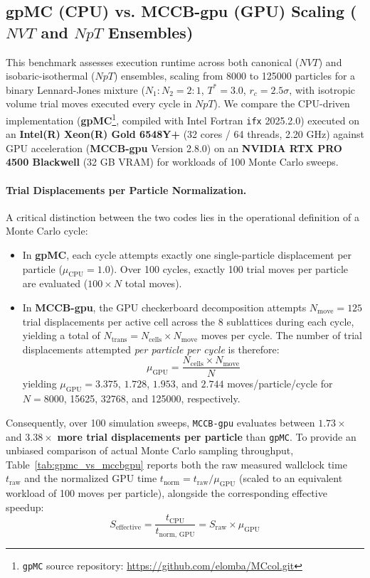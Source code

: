 \documentclass[12pt]{article}
\begin{document}
\subsection{gpMC (CPU) vs. MCCB-gpu (GPU) Scaling (\texorpdfstring{$NVT$ and $NpT$}{NVT and NpT} Ensembles)}
\label{sec:small_scale}
This benchmark assesses execution runtime across both canonical ($NVT$) and isobaric-isothermal ($NpT$) ensembles, scaling from \num{8000} to \num{125000} particles for a binary Lennard-Jones mixture ($N_1 : N_2 = 2 : 1$, $T^* = 3.0$, $r_c = 2.5\sigma$, with isotropic volume trial moves executed every cycle in $NpT$). We compare the CPU-driven implementation (\textbf{gpMC}\footnote{\texttt{gpMC} source repository: \url{https://github.com/elomba/MCcol.git}}, compiled with Intel Fortran \texttt{ifx} 2025.2.0) executed on an \textbf{Intel(R) Xeon(R) Gold 6548Y+} (32 cores / 64 threads, 2.20 GHz) against GPU acceleration (\textbf{MCCB-gpu} Version 2.8.0) on an \textbf{NVIDIA RTX PRO 4500 Blackwell} (32 GB VRAM) for workloads of 100 Monte Carlo sweeps.

\paragraph{Trial Displacements per Particle Normalization.}
A critical distinction between the two codes lies in the operational definition of a Monte Carlo cycle:
\begin{itemize}
    \item In \textbf{gpMC}, each cycle attempts exactly one single-particle displacement per particle ($\mu_{\text{CPU}} = 1.0$). Over 100 cycles, exactly 100 trial moves per particle are evaluated ($100 \times N$ total moves).
    \item In \textbf{MCCB-gpu}, the GPU checkerboard decomposition attempts $N_{\text{move}} = 125$ trial displacements per active cell across the 8 sublattices during each cycle, yielding a total of $N_{\text{trans}} = N_{\text{cells}} \times N_{\text{move}}$ moves per cycle. The number of trial displacements attempted \emph{per particle per cycle} is therefore:
    \begin{equation}
        \mu_{\text{GPU}} = \frac{N_{\text{cells}} \times N_{\text{move}}}{N}
    \end{equation}
    yielding $\mu_{\text{GPU}} = 3.375$, $1.728$, $1.953$, and $2.744$ moves/particle/cycle for $N=\num{8000}$, \num{15625}, \num{32768}, and \num{125000}, respectively.
\end{itemize}
Consequently, over 100 simulation sweeps, \texttt{MCCB-gpu} evaluates between $1.73\times$ and $3.38\times$ \textbf{more trial displacements per particle} than \texttt{gpMC}. To provide an unbiased comparison of actual Monte Carlo sampling throughput, Table~\ref{tab:gpmc_vs_mccbgpu} reports both the raw measured wallclock time $t_{\text{raw}}$ and the normalized GPU time $t_{\text{norm}} = t_{\text{raw}} / \mu_{\text{GPU}}$ (scaled to an equivalent workload of 100 moves per particle), alongside the corresponding effective speedup:
\begin{equation}
    S_{\text{effective}} = \frac{t_{\text{CPU}}}{t_{\text{norm, GPU}}} = S_{\text{raw}} \times \mu_{\text{GPU}}
\end{equation}
\end{document}
